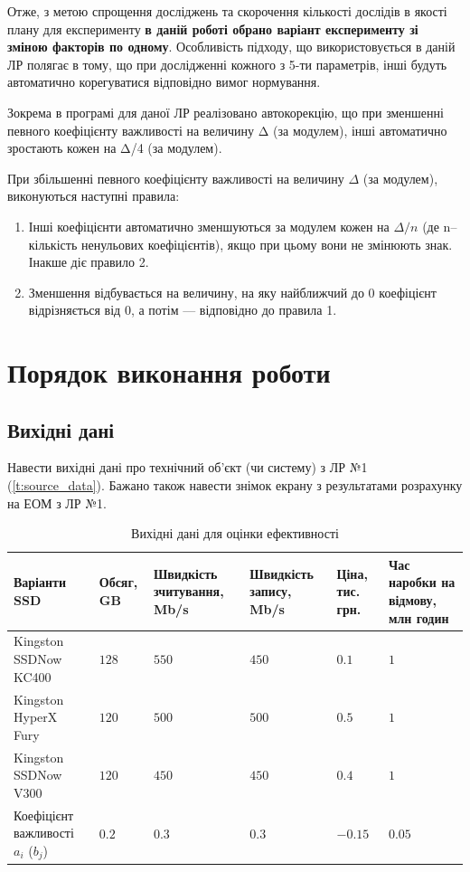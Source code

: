 Отже, з метою спрощення досліджень та скорочення кількості дослідів в якості плану для експерименту
\textbf{в даній роботі обрано варіант експерименту зі зміною факторів по одному}. Особливість підходу, що
використовується в даній ЛР полягає в тому, що при дослідженні кожного з 5-ти параметрів, інші
будуть автоматично корегуватися відповідно вимог нормування.


Зокрема в програмі для даної ЛР реалізовано автокорекцію, що при зменшенні певного коефіцієнту
важливості на величину Δ (за модулем), інші автоматично зростають кожен на Δ/4 (за модулем).

При збільшенні певного коефіцієнту важливості на величину $\Delta$ (за модулем), виконуються наступні
правила:

\begin{enumerate}
\item Інші коефіцієнти автоматично зменшуються за модулем кожен на $\Delta / n$ (де n–кількість
  ненульових коефіцієнтів), якщо при цьому вони не змінюють знак. Інакше діє правило 2.
\item Зменшення відбувається на величину, на яку найближчий до 0 коефіцієнт відрізняється від 0, а
  потім --- відповідно до правила 1.
\end{enumerate}

\section{Порядок виконання роботи}

\subsection{Вихідні дані}

Навести вихідні дані про технічний об’єкт (чи систему) з ЛР №1 (\ref{t:source_data}). Бажано
також навести знімок екрану з результатами розрахунку на ЕОМ з ЛР №1.

\begin{table}[!ht]
\centering
\caption{Вихідні дані для оцінки ефективності}
\label{t:source_data_2}
\begin{tabular}{|C{2.4cm}|C{2.0cm}|C{2.6cm}|C{2.2cm}|C{2.1cm}|C{2.6cm}|}
\hline
Варіанти SSD & Обсяг, GB & Швидкість зчитування, Mb/s & Швидкість запису, Mb/s & Ціна, тис. грн. & Час наробки на відмову, млн годин \\ \hline
Kingston SSDNow KC400 & $128$ & $550$  & $450$ & $0.1$ & $1$ \\ \hline
Kingston HyperX Fury & $120$ & $ 500$ & $500$ & $0.5$ & $1$ \\ \hline
Kingston SSDNow V300 & $120$ & $ 450$ &  $450$& $0.4$ & $1$ \\ \hline
Коефіцієнт важливості $a_i$ ($b_j$) & $0.2$ & $0.3$ & $0.3$ & $-0.15$  & $0.05$ \\ \hline
\end{tabular}
\end{table}

